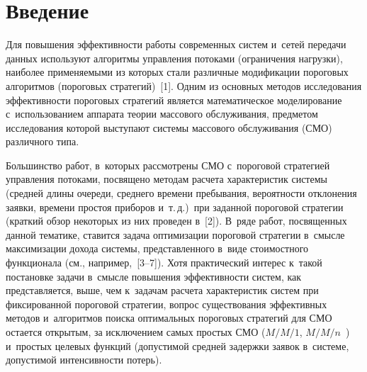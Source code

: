   

\vspace*{-8pt}


\thispagestyle{headings}

\begin{multicols}{2}

\label{st\stat}
  
\section{Введение}

  Для повышения эффективности работы современных систем и~сетей 
передачи данных используют алгоритмы управления потоками (ограничения 
нагрузки), наиболее применяемыми из которых стали различные модификации 
пороговых алгоритмов (пороговых стратегий)~[1]. Одним из основных методов 
исследования эффективности пороговых стратегий является математическое 
моделирование с~использованием аппарата теории массового обслуживания, 
предметом исследования которой выступают системы массового обслуживания 
(СМО) различного типа. 
  
  Большинство работ, в~которых рассмотрены СМО с~пороговой стратегией 
управления потоками, посвящено методам расчета характеристик системы 
(средней длины очереди, среднего времени пребывания, вероятности 
отклонения заявки, времени простоя приборов и~т.\,д.)\ при заданной пороговой 
стратегии (краткий обзор некоторых из них проведен в~[2]). 
%
В~ряде работ, 
посвященных данной тематике, ставится задача оптимизации пороговой 
стратегии в~смысле максимизации дохода системы, представленного в~виде 
стоимостного функционала (см., например,~[3--7]). Хотя практический интерес 
к~такой постановке задачи в~смысле повышения эффективности систем, как 
представляется, выше, чем к~задачам расчета характеристик систем при 
фиксированной пороговой стратегии, вопрос существования эффективных 
методов и~алгоритмов поиска оптимальных пороговых стратегий для СМО 
остается открытым, за исключением самых простых СМО ($M/M/1$, 
$M/M/n$~\cite{3-ag}) и~простых целевых функций (допустимой средней 
задержки заявок в~системе, допустимой интенсивности потерь). 
{

}


\end{multicols}
